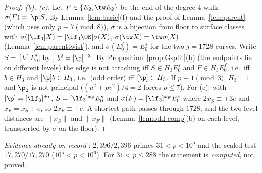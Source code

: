 \begin{proof}
\emph{(b), (c).}  Let $F\in\{E_2,\tw E_2\}$ be the end of the degree-$4$ walk; $\sigma(F)=[\p]S$.  By Lemma~\ref{lem:basic}(f) and the proof
of Lemma~\ref{lem:parent} (which uses only $p\equiv7\pmod8$), $\sigma$ is a bijection from floor to surface classes with
$\sigma([\lf_3]X)=[\lf_3\OK]\sigma(X)$, $\sigma(\tw X)=\tw\sigma(X)$ (Lemma~\ref{lem:parenttwist}), and $\sigma(E_0^f)=E_0^s$ for the two
$j=1728$ curves.  Write $S=[b]E_0^s$; by \cite[Lemma~16]{CPV}, $b^2=[\p]^{-3}$.  By Proposition~\ref{prop:Gsplit}(b) (the endpoints lie on
different levels) the edge is not attaching iff $S\in H_3E_0^s$ and $F\in H_3E_0^f$, i.e.\ iff $b\in H_3$ and $[\p]b\in H_3$, i.e.\ (odd order)
iff $[\p]\in H_3$.  If $p\equiv1\pmod3$, $H_3=1$ and $\p_2$ is not principal ($(u^2+pv^2)/4=2$ forces $p\le7$).  For (c): with $[\p]=[\lf_3]^{\pm e}$,
$S=[\lf_3]^{x_S}E_0^s$ and $\sigma(F)=[\lf_3]^{x_F}E_0^s$ where $2x_S\equiv\mp3e$ and $x_F=x_S\pm e$, so $2x_F\equiv\mp e$.  A shortest path
passes through $1728$, and the two level distances are $\|x_S\|$ and $\|x_F\|$ (Lemma~\ref{lem:odd-comp}(b) on each level, transported by $\sigma$
on the floor).
\end{proof}

\noindent\emph{Evidence already on record} \tagX: $2{,}396/2{,}396$ primes $31<p<10^5$ and the sealed test $17{,}270/17{,}270$ ($10^5<p<10^6$).  For
$31<p\le288$ the statement is \emph{computed}, not proved.

